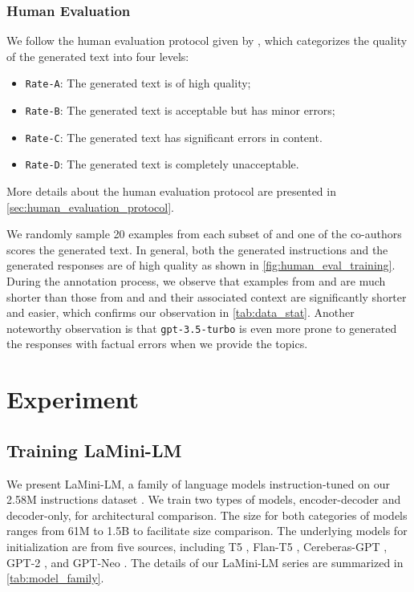 \documentclass[11pt]{article}
\newcommand{\modelnamefull}{LaMini-LM\xspace}
\newcommand{\llm}[1]{\texttt{#1}\xspace}
\newcommand{\chatgpt}{\llm{gpt-3.5-turbo}}
\begin{document}
\subsubsection{Human Evaluation}
We follow the human evaluation protocol given by \citet{DBLP:journals/corr/abs-2212-10560}, which categorizes the quality of the generated text into four levels:
\begin{itemize}
    \item \texttt{Rate-A}: The generated text is of high quality;
    \item \texttt{Rate-B}: The generated text is acceptable but has minor errors;
    \item \texttt{Rate-C}: The generated text has significant errors in content.
\item \texttt{Rate-D}: The generated text is completely unacceptable.
\end{itemize}
More details about the human evaluation protocol are presented in \autoref{sec:human_evaluation_protocol}.

We randomly sample 20 examples from each subset of  and one of the co-authors scores the generated text.
In general, both the generated instructions and the generated responses are of high quality as shown in \autoref{fig:human_eval_training}.
During the annotation process, we observe that examples from  and  are much shorter than those from  and  and their associated context are significantly shorter and easier, which confirms our observation in \autoref{tab:data_stat}.
Another noteworthy observation is that \chatgpt is even more prone to generated the responses with factual errors when we provide the topics.



 \section{Experiment}
\subsection{Training \modelnamefull}

We present \modelnamefull, a family of language models instruction-tuned on our 2.58M instructions dataset . 
We train two types of models, encoder-decoder and decoder-only, for architectural comparison.
The size for both categories of models ranges from 61M to 1.5B to facilitate size comparison. 
The underlying models for initialization are from five sources, including T5 \cite{DBLP:journals/jmlr/RaffelSRLNMZLL20}, Flan-T5 \cite{DBLP:journals/corr/abs-2210-11416}, Cereberas-GPT \cite{dey2023cerebrasgpt}, GPT-2 \cite{Radford2019LanguageMA}, and GPT-Neo \cite{DBLP:journals/corr/abs-2101-00027}.
The details of our \modelnamefull series are summarized in \autoref{tab:model_family}.
\end{document}
